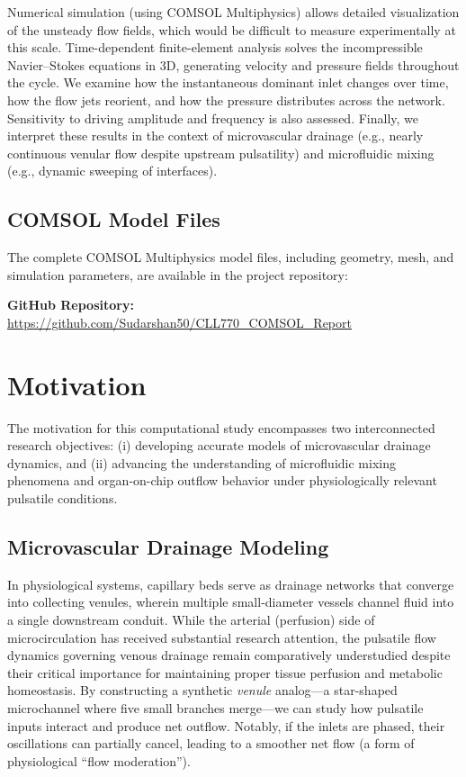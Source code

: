 \documentclass[12pt,a4paper]{article}
\begin{document}
Numerical simulation (using COMSOL Multiphysics) allows detailed visualization of the unsteady flow fields, which would be difficult to measure experimentally at this scale. Time-dependent finite-element analysis solves the incompressible Navier--Stokes equations in 3D, generating velocity and pressure fields throughout the cycle. We examine how the instantaneous dominant inlet changes over time, how the flow jets reorient, and how the pressure distributes across the network. Sensitivity to driving amplitude and frequency is also assessed. Finally, we interpret these results in the context of microvascular drainage (e.g., nearly continuous venular flow despite upstream pulsatility) and microfluidic mixing (e.g., dynamic sweeping of interfaces).

\subsection{COMSOL Model Files}

The complete COMSOL Multiphysics model files, including geometry, mesh, and simulation parameters, are available in the project repository:

\vspace{0.5em}
\noindent\textbf{GitHub Repository:} \url{https://github.com/Sudarshan50/CLL770_COMSOL_Report}

\section{Motivation}

The motivation for this computational study encompasses two interconnected research objectives: (i) developing accurate models of microvascular drainage dynamics, and (ii) advancing the understanding of microfluidic mixing phenomena and organ-on-chip outflow behavior under physiologically relevant pulsatile conditions.

\subsection{Microvascular Drainage Modeling}

In physiological systems, capillary beds serve as drainage networks that converge into collecting venules, wherein multiple small-diameter vessels channel fluid into a single downstream conduit. While the arterial (perfusion) side of microcirculation has received substantial research attention, the pulsatile flow dynamics governing venous drainage remain comparatively understudied despite their critical importance for maintaining proper tissue perfusion and metabolic homeostasis. By constructing a synthetic \textit{venule} analog---a star-shaped microchannel where five small branches merge---we can study how pulsatile inputs interact and produce net outflow. Notably, if the inlets are phased, their oscillations can partially cancel, leading to a smoother net flow (a form of physiological ``flow moderation'').
\end{document}
